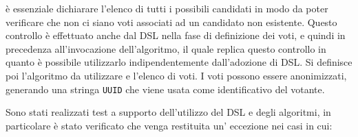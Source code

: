 \documentclass[12pt,a4paper,openright,twoside]{book}
\begin{document}
è essenziale dichiarare l'elenco di tutti i possibili candidati in modo da poter verificare che non ci siano voti associati ad un candidato non esistente.
Questo controllo è effettuato anche dal DSL nella fase di definizione dei voti, e quindi in precedenza all'invocazione dell'algoritmo,
il quale replica questo controllo in quanto è possibile utilizzarlo indipendentemente dall'adozione di DSL.
Si definisce poi l'algoritmo da utilizzare e l'elenco di voti. I voti possono essere anonimizzati, generando una stringa \texttt{UUID} che viene usata come identificativo del votante.



Sono stati realizzati test a supporto dell'utilizzo del DSL e degli algoritmi, in particolare è stato verificato che venga 
restituita un' eccezione nei casi in cui: 
\end{document}
